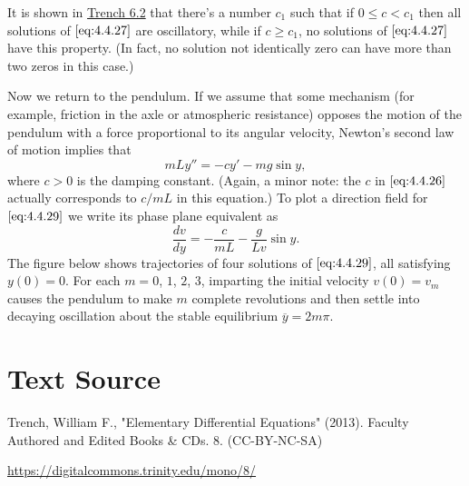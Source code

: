 \documentclass{ximera}
\begin{document}
 
It is shown in \href{https://ximera.osu.edu/ode/main/springProblemsII/springProblemsII}{Trench 6.2} that there's a number $c_1$ such that if $0\leq
c<c_1$ then  all solutions of $\eqref{eq:4.4.27}$ are oscillatory, while if
$c\geq c_1$,  no solutions of $\eqref{eq:4.4.27}$ have this property. (In
fact, no solution not identically zero can have more than two zeros in
this case.) 
 
 
 
\begin{example}\label{example:4.4.5}
Now we
return to the pendulum. If we assume that
some mechanism (for example, friction in the axle or atmospheric
resistance) opposes the motion of the pendulum with a force
proportional to its angular velocity,  Newton's second law of
motion implies that
\begin{equation}\label{eq:4.4.29}
mLy''=-cy'-mg\sin y,
\end{equation}
where $c>0$ is the damping constant. (Again, a minor note: the $c$
in $\eqref{eq:4.4.26}$ actually corresponds to $c/mL$ in this equation.)
To plot a direction field for $\eqref{eq:4.4.29}$ we write its phase plane
equivalent as
$$
\frac{dv}{dy}=-\frac{c}{mL}-\frac{g}{Lv} \sin y.
$$
The figure below shows
trajectories of four solutions of $\eqref{eq:4.4.29}$, all satisfying
$y(0)=0$. For each $m=0$, $1$, $2$, $3$, imparting the initial velocity
$v(0)=v_m$ causes the pendulum to make $m$ complete revolutions and
then settle into decaying oscillation about the stable equilibrium
$\overline{y}=2m\pi$.

\begin{center}
\end{center}
 
 
 
\end{example}
 
 
 
 
 
 
\section*{Text Source}
Trench, William F., "Elementary Differential Equations" (2013). Faculty Authored and Edited Books \& CDs. 8. (CC-BY-NC-SA)
 
\href{https://digitalcommons.trinity.edu/mono/8/}{https://digitalcommons.trinity.edu/mono/8/}
 
 
\end{document}
